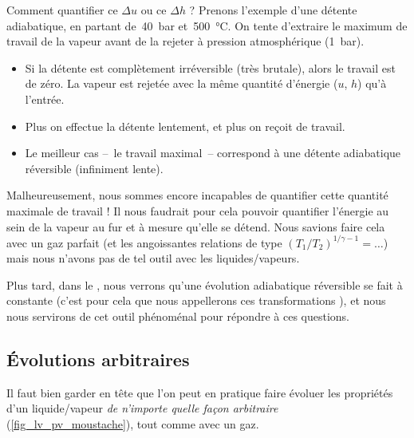 		Comment quantifier ce $\Delta u$ ou ce $\Delta h$ ? Prenons l’exemple d’une détente adiabatique, en partant de~\SI{40}{\bar} et~\SI{500}{\degreeCelsius}. On tente d’extraire le maximum de travail de la vapeur avant de la rejeter à pression atmosphérique (\SI{1}{\bar}).
		
		\begin{itemize}
			\item Si la détente est complètement irréversible (très brutale), alors le travail est de zéro. La vapeur est rejetée avec la même quantité d’énergie ($u$, $h$) qu’à l’entrée.
			\item Plus on effectue la détente lentement, et plus on reçoit de travail.
			\item Le meilleur cas --\ le travail maximal\ -- correspond à une détente adiabatique réversible (infiniment lente).
		\end{itemize}

		Malheureusement, nous sommes encore incapables de quantifier cette quantité maximale de travail ! Il nous faudrait pour cela pouvoir quantifier l’énergie au sein de la vapeur au fur et à mesure qu’elle se détend. Nous savions faire cela avec un gaz parfait (et les angoissantes relations de type $(T_1/T_2)^{1/\gamma-1} = \ldots$) mais nous n’avons pas de tel outil avec les liquides/vapeurs.


		Plus tard, dans le \courshuit, nous verrons qu’une évolution adiabatique réversible se fait à  constante (c’est pour cela que nous appellerons ces transformations ), et nous nous servirons de cet outil phénoménal pour répondre à ces questions.



	\subsection{Évolutions arbitraires}
	
		Il faut bien garder en tête que l’on peut en pratique faire évoluer les propriétés d’un liquide/vapeur \emph{de n’importe quelle façon arbitraire} (\cref{fig_lv_pv_moustache}), tout comme avec un gaz.
		
